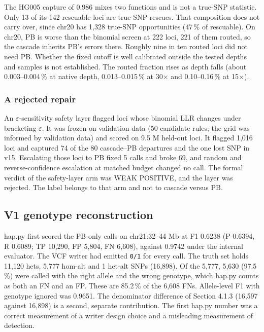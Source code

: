 \documentclass[11pt,a4paper]{article}
\makeatletter
\newcommand{\needspace}[1]{\par\ifdim\pagegoal=\maxdimen\else\dimen@=\pagegoal\advance\dimen@-\pagetotal\ifdim\dimen@<#1\relax\newpage\fi\fi}
\makeatother
\begin{document}
The HG005 capture of 0.986 mixes two functions and is not a true-SNP statistic. Only 13 of its 142 rescuable loci are true-SNP rescues. That composition does not carry over, since chr20 has 1,328 true-SNP opportunities (47\,\% of rescuable). On chr20, PB is worse than the binomial screen at 222 loci, 221 of them routed, so the cascade inherits PB's errors there. Roughly nine in ten routed loci did not need PB. Whether the fixed cutoff is well calibrated outside the tested depths and samples is not established. The routed fraction rises as depth falls (about 0.003--0.004\,\% at native depth, 0.013--0.015\,\% at 30$\times$ and 0.10--0.16\,\% at 15$\times$).

\needspace{5\baselineskip}
\subsubsection{\texorpdfstring{A rejected repair}{A rejected repair}}
An $\varepsilon$-sensitivity safety layer flagged loci whose binomial LLR changes under bracketing $\varepsilon$. It was frozen on validation data (50 candidate rules; the grid was informed by validation data) and scored on 9.5 M held-out loci. It flagged 1,016 loci and captured 74 of the 80 cascade--PB departures and the one lost SNP in v15. Escalating those loci to PB fixed 5 calls and broke 69, and random and reverse-confidence escalation at matched budget changed no call. The formal verdict of the safety-layer arm was WEAK POSITIVE, and the layer was rejected. The label belongs to that arm and not to cascade versus PB.

\needspace{6\baselineskip}
\subsection{\texorpdfstring{V1 genotype reconstruction}{V1 genotype reconstruction}}
hap.py first scored the PB-only calls on chr21:32--44 Mb at F1 0.6238 (P 0.6394, R 0.6089; TP 10,290, FP 5,804, FN 6,608), against 0.9742 under the internal evaluator. The VCF writer had emitted \texttt{0/\allowbreak{}1} for every call. The truth set holds 11,120 hets, 5,777 hom-alt and 1 het-alt SNPs (16,898). Of the 5,777, 5,630 (97.5\,\%) were called with the right allele and the wrong genotype, which hap.py counts as both an FN and an FP. These are 85.2\,\% of the 6,608 FNs. Allele-level F1 with genotype ignored was 0.9651. The denominator difference of Section 4.1.3 (16,597 against 16,898) is a second, separate contribution. The first hap.py number was a correct measurement of a writer design choice and a misleading measurement of detection.
\end{document}
